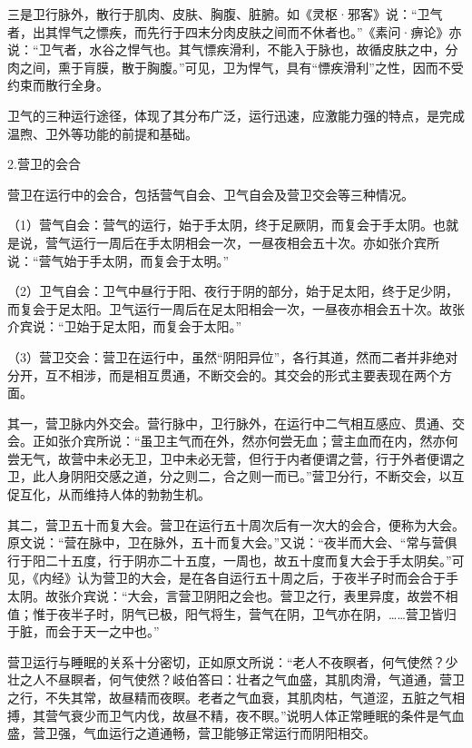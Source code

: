 \documentclass[12pt]{ctexbook}
\begin{document}
三是卫行脉外，散行于肌肉、皮肤、胸腹、脏腑。如《灵枢·邪客》说：“卫气者，出其悍气之慓疾，而先行于四末分肉皮肤之间而不休者也。”《素问·痹论》亦说：“卫气者，水谷之悍气也。其气慓疾滑利，不能入于脉也，故循皮肤之中，分肉之间，熏于肓膜，散于胸腹。”可见，卫为悍气，具有“慓疾滑利”之性，因而不受约束而散行全身。

卫气的三种运行途径，体现了其分布广泛，运行迅速，应激能力强的特点，是完成温煦、卫外等功能的前提和基础。

2.营卫的会合

营卫在运行中的会合，包括营气自会、卫气自会及营卫交会等三种情况。

（1）营气自会：营气的运行，始于手太阴，终于足厥阴，而复会于手太阴。也就是说，营气运行一周后在手太阴相会一次，一昼夜相会五十次。亦如张介宾所说：“营气始于手太阴，而复会于太明。”

（2）卫气自会：卫气中昼行于阳、夜行于阴的部分，始于足太阳，终于足少阴，而复会于足太阳。卫气运行一周后在足太阳相会一次，一昼夜亦相会五十次。故张介宾说：“卫始于足太阳，而复会于太阳。”

（3）营卫交会：营卫在运行中，虽然“阴阳异位”，各行其道，然而二者并非绝对分开，互不相涉，而是相互贯通，不断交会的。其交会的形式主要表现在两个方面。

其一，营卫脉内外交会。营行脉中，卫行脉外，在运行中二气相互感应、贯通、交会。正如张介宾所说：“虽卫主气而在外，然亦何尝无血；营主血而在内，然亦何尝无气，故营中未必无卫，卫中未必无营，但行于内者便谓之营，行于外者便谓之卫，此人身阴阳交感之道，分之则二，合之则一而已。”营卫分行，不断交会，以互促互化，从而维持人体的勃勃生机。

其二，营卫五十而复大会。营卫在运行五十周次后有一次大的会合，便称为大会。原文说：“营在脉中，卫在脉外，五十而复大会。”又说：“夜半而大会、“常与营俱行于阳二十五度，行于阴亦二十五度，一周也，故五十度而复大会于手太阴矣。”可见，《内经》认为营卫的大会，是在各自运行五十周之后，于夜半子时而会合于手太阴。故张介宾说：“大会，言营卫阴阳之会也。营卫之行，表里异度，故尝不相值；惟于夜半子时，阴气已极，阳气将生，营气在阴，卫气亦在阴，……营卫皆归于脏，而会于天一之中也。”



营卫运行与睡眠的关系十分密切，正如原文所说：“老人不夜瞑者，何气使然？少壮之人不昼瞑者，何气使然？岐伯答曰：壮者之气血盛，其肌肉滑，气道通，营卫之行，不失其常，故昼精而夜瞑。老者之气血衰，其肌肉枯，气道涩，五脏之气相搏，其营气衰少而卫气内伐，故昼不精，夜不瞑。”说明人体正常睡眠的条件是气血盛，营卫强，气血运行之道通畅，营卫能够正常运行而阴阳相交。
\end{document}
